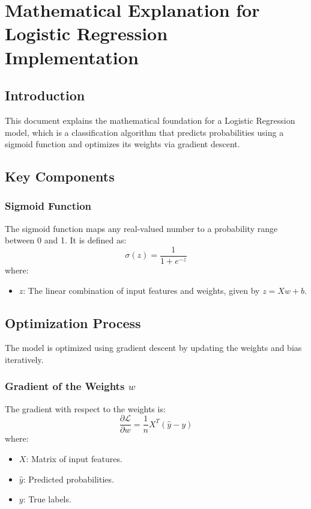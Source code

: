\documentclass{article}
\begin{document}
\section*{Mathematical Explanation for Logistic Regression Implementation}

\subsection*{Introduction}
This document explains the mathematical foundation for a Logistic Regression model, which is a classification algorithm that predicts probabilities using a sigmoid function and optimizes its weights via gradient descent.

\subsection*{Key Components}

\subsubsection*{Sigmoid Function}
The sigmoid function maps any real-valued number to a probability range between 0 and 1. It is defined as:
\[
\sigma(z) = \frac{1}{1 + e^{-z}}
\]
where:
\begin{itemize}
    \item \( z \): The linear combination of input features and weights, given by \( z = Xw + b \).
\end{itemize}

\subsection*{Optimization Process}
The model is optimized using gradient descent by updating the weights and bias iteratively.

\subsubsection*{Gradient of the Weights \( w \)}
The gradient with respect to the weights is:
\[
\frac{\partial \mathcal{L}}{\partial w} = \frac{1}{n} X^T (\hat{y} - y)
\]
where:
\begin{itemize}
    \item \( X \): Matrix of input features.
    \item \( \hat{y} \): Predicted probabilities.
    \item \( y \): True labels.
\end{itemize}
\end{document}
